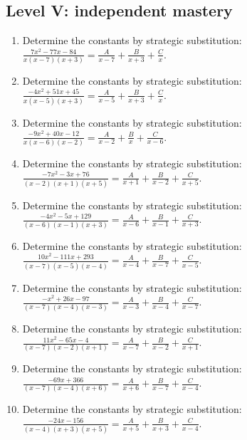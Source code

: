 \documentclass[11pt,oneside]{book}
\begin{document}
\subsection*{Level V: independent mastery}
\begin{enumerate}[leftmargin=*,label=\textbf{\arabic*.},itemsep=0.65\baselineskip]
\item Determine the constants by strategic substitution: $\displaystyle \frac{7 x^{2} - 77 x - 84}{x \left(x - 7\right) \left(x + 3\right)}=\frac{A}{x - 7} + \frac{B}{x + 3} + \frac{C}{x}$.
\item Determine the constants by strategic substitution: $\displaystyle \frac{- 4 x^{2} + 51 x + 45}{x \left(x - 5\right) \left(x + 3\right)}=\frac{A}{x - 5} + \frac{B}{x + 3} + \frac{C}{x}$.
\item Determine the constants by strategic substitution: $\displaystyle \frac{- 9 x^{2} + 40 x - 12}{x \left(x - 6\right) \left(x - 2\right)}=\frac{A}{x - 2} + \frac{B}{x} + \frac{C}{x - 6}$.
\item Determine the constants by strategic substitution: $\displaystyle \frac{- 7 x^{2} - 3 x + 76}{\left(x - 2\right) \left(x + 1\right) \left(x + 5\right)}=\frac{A}{x + 1} + \frac{B}{x - 2} + \frac{C}{x + 5}$.
\item Determine the constants by strategic substitution: $\displaystyle \frac{- 4 x^{2} - 5 x + 129}{\left(x - 6\right) \left(x - 1\right) \left(x + 3\right)}=\frac{A}{x - 6} + \frac{B}{x - 1} + \frac{C}{x + 3}$.
\item Determine the constants by strategic substitution: $\displaystyle \frac{10 x^{2} - 111 x + 293}{\left(x - 7\right) \left(x - 5\right) \left(x - 4\right)}=\frac{A}{x - 4} + \frac{B}{x - 7} + \frac{C}{x - 5}$.
\item Determine the constants by strategic substitution: $\displaystyle \frac{- x^{2} + 26 x - 97}{\left(x - 7\right) \left(x - 4\right) \left(x - 3\right)}=\frac{A}{x - 3} + \frac{B}{x - 4} + \frac{C}{x - 7}$.
\item Determine the constants by strategic substitution: $\displaystyle \frac{11 x^{2} - 65 x - 4}{\left(x - 7\right) \left(x - 2\right) \left(x + 1\right)}=\frac{A}{x - 7} + \frac{B}{x - 2} + \frac{C}{x + 1}$.
\item Determine the constants by strategic substitution: $\displaystyle \frac{- 69 x + 366}{\left(x - 7\right) \left(x - 4\right) \left(x + 6\right)}=\frac{A}{x + 6} + \frac{B}{x - 7} + \frac{C}{x - 4}$.
\item Determine the constants by strategic substitution: $\displaystyle \frac{- 24 x - 156}{\left(x - 4\right) \left(x + 3\right) \left(x + 5\right)}=\frac{A}{x + 5} + \frac{B}{x + 3} + \frac{C}{x - 4}$.
\end{enumerate}
\end{document}

